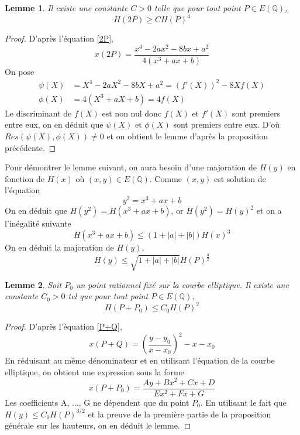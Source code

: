 \documentclass{article}
\newtheorem{lemme}{Lemme}
\begin{document}
\begin{lemme}
\label{lem2P}
Il existe une constante $C > 0$ telle que pour tout point $P \in E(\mathbb{Q})$,
\begin{equation*}
H(2P) \geq CH(P)^4
\end{equation*}
\end{lemme}

\begin{proof}
D'après l'équation \ref{2P}, 
\begin{equation*}
x(2P) = \frac{x^4 - 2ax^2 - 8bx + a^2}{4(x^3 + ax + b)}
\end{equation*}
On pose
\begin{align*}
\psi(X) &= X^4 - 2aX^2 - 8bX + a^2 = (f'(X))^2 - 8Xf(X)\\
\phi(X) &= 4(X^3 + aX + b) = 4f(X)
\end{align*}
Le discriminant de $f(X)$ est non nul donc $f(X)$ et $f'(X)$ sont premiers entre eux, on en déduit que 
$\psi(X)$ et $\phi(X)$ sont premiers entre eux.
D'où $Res(\psi(X), \phi(X)) \neq 0$ et on obtient le lemme d'après la proposition précédente.
\end{proof}

Pour démontrer le lemme suivant, on aura besoin d'une majoration de $H(y)$ en fonction de $H(x)$ où 
$(x,y) \in E(\mathbb{Q})$. Comme $(x, y)$ est solution de l'équation
\begin{equation*}
y^2 = x^3 + ax + b
\end{equation*}
On en déduit que $H(y^2)=H(x^3+ax+b)$, or $H(y^2)=H(y)^2$ et on a l'inégalité suivante
\begin{equation*}
H(x^3+ax+b)\leq (1+|a|+|b|)H(x)^3
\end{equation*}
On en déduit la majoration de $H(y)$,
\begin{equation*}
H(y) \leq \sqrt{1 + |a| + |b|}H(P)^{\frac{3}{2}}
\end{equation*}

\begin{lemme}
\label{lemP+P0}
Soit $P_{0}$ un point rationnel fixé sur la courbe elliptique. Il existe une constante $C_{0} > 0$ tel que
pour tout point $P\in E(\mathbb{Q})$,
\begin{equation*}
H(P+P_{0}) \leq C_{0}H(P)^2
\end{equation*}
\end{lemme}

\begin{proof}
D'après l'équation \ref{P+Q},
\begin{equation*}
x(P+Q) = (\frac{y - y_{0}}{x - x_{0}})^2 - x - x_{0}
\end{equation*}
En réduisant au même dénominateur et en utilisant l'équation de la courbe elliptique,
on obtient une expression sous la forme
\begin{equation*}
x(P+P_{0}) = \frac{Ay + Bx^2 + Cx + D}{Ex^2 + Fx + G}
\end{equation*}
Les coefficients A, ..., G ne dépendent que du point $P_{0}$. En utilisant le fait que
$H(y)\leq C_{0}H(P)^{3/2}$ et la preuve de la première partie de la
proposition générale sur les hauteurs, on en déduit le lemme.
\end{proof}
\end{document}

